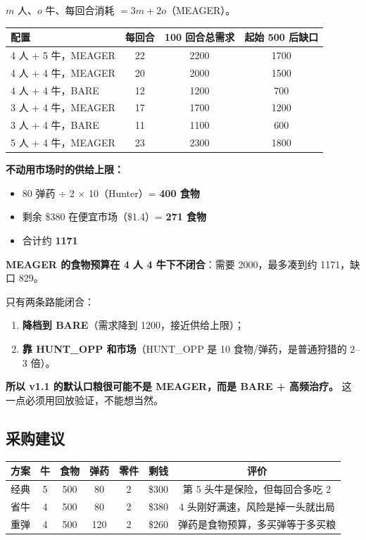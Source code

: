 \documentclass[UTF8,11pt,a4paper]{ctexart}
\begin{document}
$m$ 人、$o$ 牛、每回合消耗 $=3m+2o$（MEAGER）。

\begin{center}
\begin{tabular}{@{}lccc@{}}
\toprule
\textbf{配置} & \textbf{每回合} & \textbf{100 回合总需求} & \textbf{起始 500 后缺口} \\
\midrule
4 人 + 5 牛，MEAGER & 22 & 2200 & 1700 \\
4 人 + 4 牛，MEAGER & 20 & 2000 & 1500 \\
4 人 + 4 牛，BARE & 12 & 1200 & 700 \\
3 人 + 4 牛，MEAGER & 17 & 1700 & 1200 \\
3 人 + 4 牛，BARE & 11 & 1100 & 600 \\
5 人 + 4 牛，MEAGER & 23 & 2300 & 1800 \\
\bottomrule
\end{tabular}
\end{center}

\textbf{不动用市场时的供给上限：}

\begin{itemize}[leftmargin=1.5em]
  \item 80 弹药 $\div$ 2 $\times$ 10（Hunter）= \textbf{400 食物}
  \item 剩余 \$380 在便宜市场（\$1.4）= \textbf{271 食物}
  \item 合计约 \textbf{1171}
\end{itemize}

\begin{warnbox}[title={这是 v1.1 最重要的一条结论}]
\textbf{MEAGER 的食物预算在 4 人 4 牛下不闭合}：需要 2000，最多凑到约 1171，缺口 829。

只有两条路能闭合：
\begin{enumerate}[leftmargin=1.5em]
  \item \textbf{降档到 BARE}（需求降到 1200，接近供给上限）；
  \item \textbf{靠 HUNT\_OPP 和市场}（HUNT\_OPP 是 10 食物/弹药，是普通狩猎的 2--3 倍）。
\end{enumerate}
\textbf{所以 v1.1 的默认口粮很可能不是 MEAGER，而是 BARE + 高频治疗。}
这一点必须用回放验证，不能想当然。
\end{warnbox}

\subsection{采购建议}

\begin{center}
\small
\begin{tabular}{@{}lcccccc@{}}
\toprule
\textbf{方案} & \textbf{牛} & \textbf{食物} & \textbf{弹药} & \textbf{零件} & \textbf{剩钱} & \textbf{评价} \\
\midrule
经典 & 5 & 500 & 80 & 2 & \$300 & 第 5 头牛是保险，但每回合多吃 2 \\
省牛 & 4 & 500 & 80 & 2 & \$380 & 4 头刚好满速，风险是掉一头就出局 \\
重弹 & 4 & 500 & 120 & 2 & \$260 & 弹药是食物预算，多买弹等于多买粮 \\
\bottomrule
\end{tabular}
\end{center}
\end{document}
